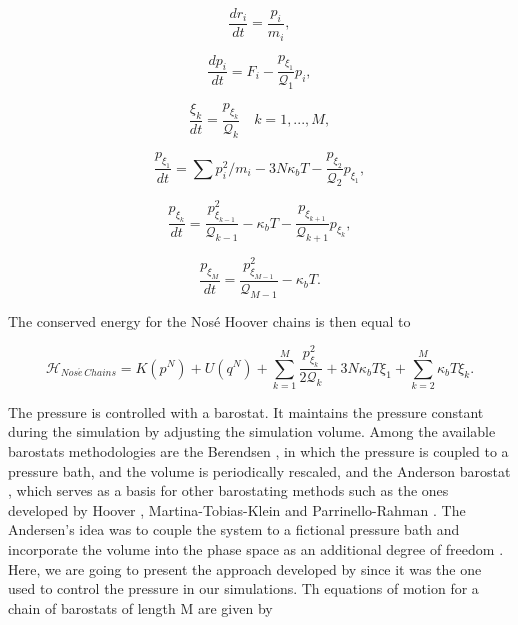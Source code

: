 \begin{equation}
\frac{dr_{i}}{dt} = \frac{p_i}{m_i},
\end{equation}

\begin{equation}
\frac{dp_{i}}{dt} = F_i  - \frac{p_{\xi _{1}}}{\mathcal{Q} _1} p_{i},
\end{equation}

\begin{equation}
\frac{\xi _{k}}{dt} = \frac{p_{\xi _k}}{\mathcal{Q} _{k}} \quad k = 1,...,M ,
\end{equation}

\begin{equation}
\frac{p_{\xi _1}}{dt} = {\sum p_{i}^{2}/m_{i} - 3N\kappa_{b}T} -  \frac{p_{\xi _{2}}}{\mathcal{Q} _2}p_{\xi _{1}},
\end{equation}

\begin{equation}
\frac{p_{\xi _k}}{dt} = \frac{p_{\xi _{k -1}}^{2}}{\mathcal{Q} _{k-1}} - \kappa_{b}T - \frac{p_{\xi _{k+1}}}{\mathcal{Q} _{k+1}}p_{\xi _{k}},
\end{equation}

\begin{equation}
\frac{p_{\xi _M}}{dt} = \frac{ p_{\xi _{M-1}}^{2}}{\mathcal{Q} _{M-1}} - \kappa_{b}T .
\end{equation}

The conserved energy for the Nos\'{e} Hoover chains is then equal to

\begin{equation}
\mathcal{H}_{Nos\acute{e} \, Chains} =  K(p^{N}) + U(q^{N})  + \sum_{k=1}^{M }\frac{p^{2}_{\xi _{k}}}{2\mathcal{Q} _{k}} + 3N\kappa_{b}T \xi _{1} + \sum_{k=2}^{M} \kappa_{b}T \xi _{k}.
\end{equation}

The pressure is controlled with a barostat. It maintains the pressure constant during the simulation by adjusting the simulation volume. Among the available  barostats methodologies are the Berendsen \cite{doi:10.1063/1.448118}, in which the pressure is coupled to a pressure bath, and the volume is periodically rescaled, and the Anderson barostat \cite{1980JChPh722384A}, which serves as a basis for other barostating methods such as the ones developed by Hoover \cite{PhysRevA.31.1695}, Martina-Tobias-Klein \cite{doi:10.1063/1.467468} and Parrinello-Rahman \cite{doi:10.1063/1.328693}. The Andersen's idea was to couple the system to a fictional pressure bath and incorporate the volume into the phase space as an additional degree of freedom \cite{tuckerman}. Here, we are going to present the approach developed by \cite{doi:10.1063/1.467468} since it was the one used to control the pressure in our simulations. Th equations of motion for a chain of barostats of length M are given by  

